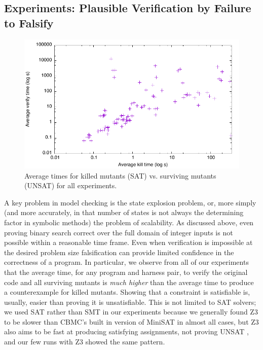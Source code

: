 \documentclass[conference]{IEEEtran}
\begin{document}

\subsection{Experiments: Plausible Verification by Failure to Falsify}
\label{sec:sattimes}

\begin{figure}
\includegraphics[width=\columnwidth]{sattimes}
\caption{Average times for killed mutants (SAT) vs. surviving mutants 
  (UNSAT) for all experiments.}
\label{fig:sattimes}
\end{figure}

A key problem in model checking is the state explosion problem, or,
more simply (and more accurately, in that number of states is not
always the determining factor in symbolic methods) the problem of
scalability.  As discussed above, even proving binary search correct
over the full domain of integer inputs is not possible within a
reasonable time frame.  Even when verification is impossible at the
desired problem size falsification can provide limited
confidence in the correctness of a program.  In particular, we observe
from all of our experiments that the average time, for any program and
harness pair, to verify the original code and all surviving mutants is
\emph{much higher} than the average time to produce a counterexample
for killed mutants.  Showing that a constraint is satisfiable is,
usually, easier than proving it is unsatisfiable.  This is not limited
to SAT solvers; we used SAT rather than SMT in our experiments because
we generally found Z3 to be slower than CBMC's built in version of
MiniSAT\cite{minisat} in almost all cases, but Z3 also
aims to be fast at producing satisfying assignments, not proving UNSAT
\cite{z3}, and our few runs with Z3 showed the same pattern.
\end{document}
